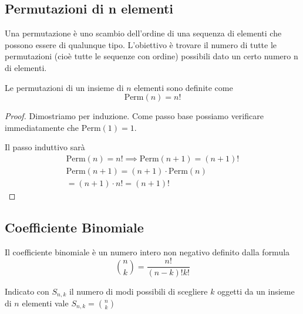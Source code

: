 \subsection{Permutazioni di n elementi}

\begin{defn}
    Una permutazione \`e uno scambio dell'ordine di una sequenza di elementi che possono essere di qualunque tipo. L'obiettivo \`e trovare il numero di tutte le permutazioni (cio\`e tutte le sequenze con ordine) possibili dato un certo numero n di elementi.
\end{defn}

\begin{prop}
        Le permutazioni di un insieme di $ n $ elementi sono definite come
        \begin{equation}
        \text{Perm}(n) = n!
        \end{equation}
\end{prop}

\begin{proof}
    Dimostriamo per induzione. Come passo base possiamo verificare immediatamente che 
    $ \text{Perm}(1) = 1 $.

    Il passo induttivo sar\`a 
    \begin{equation*}
        \begin{aligned}
            \text{Perm}(n) = n! \implies \text{Perm}(n+1) = (n+1)! \\
            \text{Perm}(n+1) = (n+1) \cdot \text{Perm}(n) \\
            = (n+1) \cdot n! = (n+1)!
        \end{aligned}
    \end{equation*}
\end{proof}

\subsection{Coefficiente Binomiale}

\begin{defn}
    Il coefficiente binomiale \`e un numero intero non negativo definito dalla formula
    \begin{equation}
        \binom{n}{k} = \dfrac{n!}{(n-k)!k!}
    \end{equation}
\end{defn}

\begin{prop}
    Indicato con $S_{n,k} $ il numero di modi possibili di scegliere $k$ oggetti da un insieme di $n$ elementi
    vale $S_{n,k}=\binom{n}{k}$
\end{prop}

